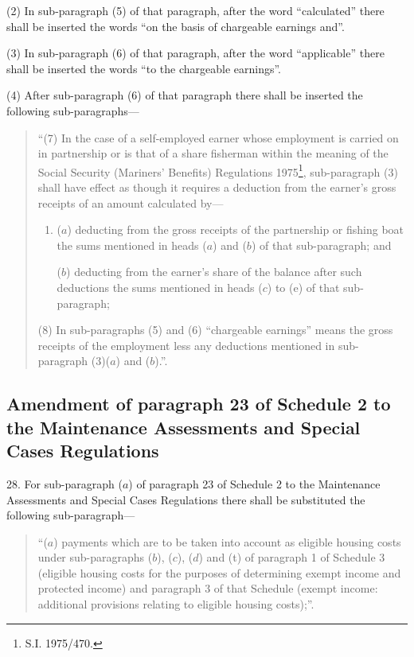 \documentclass[12pt,a4paper]{article}
\begin{document}
(2) In sub-paragraph (5) of that paragraph, after the word “calculated” there shall be inserted the words “on the basis of chargeable earnings and”.

(3) In sub-paragraph (6) of that paragraph, after the word “applicable” there shall be inserted the words “to the chargeable earnings”.

(4) After sub-paragraph (6) of that paragraph there shall be inserted the following sub-paragraphs---
\begin{quotation}
“(7) In the case of a self-employed earner whose employment is carried on in partnership or is that of a share fisherman within the meaning of the Social Security (Mariners' Benefits) Regulations 1975\footnote{\frenchspacing  S.I. 1975/470.}, sub-paragraph (3) shall have effect as though it requires a deduction from the earner’s gross receipts of an amount calculated by---
\begin{enumerate}\item[]
($a$) deducting from the gross receipts of the partnership or fishing boat the sums mentioned in heads ($a$) and ($b$) of that sub-paragraph; and

($b$) deducting from the earner’s share of the balance after such deductions the sums mentioned in heads ($c$) to (e) of that sub-paragraph;
\end{enumerate}

(8) In sub-paragraphs (5) and (6) “chargeable earnings” means the gross receipts of the employment less any deductions mentioned in sub-paragraph (3)($a$) and ($b$).”.
\end{quotation}

\subsection[28. Amendment of paragraph 23 of Schedule 2 to the Maintenance Assessments and Special Cases Regulations]{Amendment of paragraph 23 of Schedule 2 to the Maintenance Assessments and Special Cases Regulations}

28.  For sub-paragraph ($a$) of paragraph 23 of Schedule 2 to the Maintenance Assessments and Special Cases Regulations there shall be substituted the following sub-paragraph---
\begin{quotation}
“($a$) payments which are to be taken into account as eligible housing costs under sub-paragraphs ($b$), ($c$), ($d$) and (t) of paragraph 1 of Schedule 3 (eligible housing costs for the purposes of determining exempt income and protected income) and paragraph 3 of that Schedule (exempt income: additional provisions relating to eligible housing costs);”.
\end{quotation}
\end{document}
